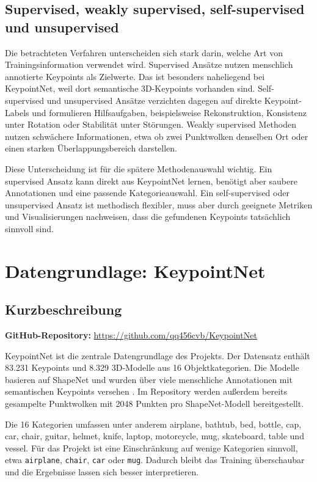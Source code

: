 \documentclass[11pt,a4paper]{article}
\begin{document}
\subsection{Supervised, weakly supervised, self-supervised und unsupervised}

Die betrachteten Verfahren unterscheiden sich stark darin, welche Art von Trainingsinformation verwendet wird. Supervised Ansätze nutzen menschlich annotierte Keypoints als Zielwerte. Das ist besonders naheliegend bei KeypointNet, weil dort semantische 3D-Keypoints vorhanden sind. Self-supervised und unsupervised Ansätze verzichten dagegen auf direkte Keypoint-Labels und formulieren Hilfsaufgaben, beispielsweise Rekonstruktion, Konsistenz unter Rotation oder Stabilität unter Störungen. Weakly supervised Methoden nutzen schwächere Informationen, etwa ob zwei Punktwolken denselben Ort oder einen starken Überlappungsbereich darstellen.

Diese Unterscheidung ist für die spätere Methodenauswahl wichtig. Ein supervised Ansatz kann direkt aus KeypointNet lernen, benötigt aber saubere Annotationen und eine passende Kategorieauswahl. Ein self-supervised oder unsupervised Ansatz ist methodisch flexibler, muss aber durch geeignete Metriken und Visualisierungen nachweisen, dass die gefundenen Keypoints tatsächlich sinnvoll sind.

\section{Datengrundlage: KeypointNet}

\subsection{Kurzbeschreibung}

\textbf{GitHub-Repository:} \url{https://github.com/qq456cvb/KeypointNet}

KeypointNet ist die zentrale Datengrundlage des Projekts. Der Datensatz enthält 83.231 Keypoints und 8.329 3D-Modelle aus 16 Objektkategorien. Die Modelle basieren auf ShapeNet und wurden über viele menschliche Annotationen mit semantischen Keypoints versehen \cite{you2020keypointnet}. Im Repository werden außerdem bereits gesampelte Punktwolken mit 2048 Punkten pro ShapeNet-Modell bereitgestellt.

Die 16 Kategorien umfassen unter anderem airplane, bathtub, bed, bottle, cap, car, chair, guitar, helmet, knife, laptop, motorcycle, mug, skateboard, table und vessel. Für das Projekt ist eine Einschränkung auf wenige Kategorien sinnvoll, etwa \texttt{airplane}, \texttt{chair}, \texttt{car} oder \texttt{mug}. Dadurch bleibt das Training überschaubar und die Ergebnisse lassen sich besser interpretieren.
\end{document}
